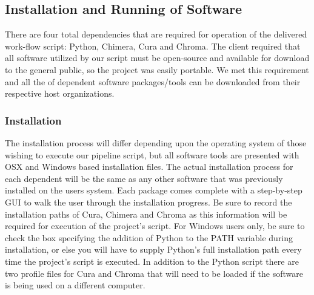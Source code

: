 \documentclass[letterpaper, onecolumn, draftclsnofoot, 10pt, compsoc]{IEEEtran}
\begin{document}
\begin{singlespace}
\subsection{Installation and Running of Software}
There are four total dependencies that are required for operation of the delivered work-flow script: Python, Chimera, Cura and Chroma. The client required that all software utilized by our script must be open-source and available for download to the general public, so the project was easily portable. We met this requirement and all the of dependent software packages/tools can be downloaded from their respective host organizations.
\subsubsection{Installation}
The installation process will differ depending upon the operating system of those wishing to execute our pipeline script, but all software tools are presented with OSX and Windows based installation files. The actual installation process for each dependent will be the same as any other software that was previously installed on the users system. Each package comes complete with a step-by-step GUI to walk the user through the installation progress. Be sure to record the installation paths of Cura, Chimera and Chroma as this information will be required for execution of the project's script. For Windows users only, be sure to check the box specifying the addition of Python to the PATH variable during installation, or else you will have to supply Python's full installation path every time the project's script is executed. In addition to the Python script there are two profile files for Cura and Chroma that will need to be loaded if the software is being used on a different computer.

\end{singlespace}
\end{document}
